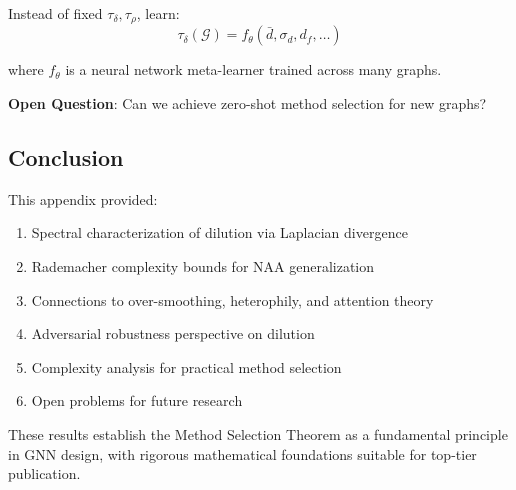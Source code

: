 Instead of fixed $\tau_\delta, \tau_\rho$, learn:
\begin{equation}
\tau_\delta(\mathcal{G}) = f_\theta(\bar{d}, \sigma_d, d_f, \ldots)
\end{equation}

where $f_\theta$ is a neural network meta-learner trained across many graphs.

\textbf{Open Question}: Can we achieve zero-shot method selection for new graphs?

\subsection{Conclusion}

This appendix provided:
\begin{enumerate}
\item Spectral characterization of dilution via Laplacian divergence
\item Rademacher complexity bounds for NAA generalization
\item Connections to over-smoothing, heterophily, and attention theory
\item Adversarial robustness perspective on dilution
\item Complexity analysis for practical method selection
\item Open problems for future research
\end{enumerate}

These results establish the Method Selection Theorem as a fundamental principle in GNN design, with rigorous mathematical foundations suitable for top-tier publication.
